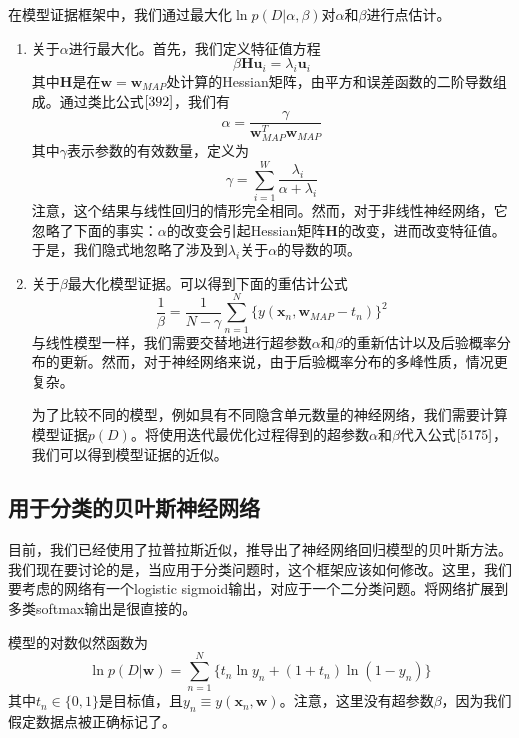 在模型证据框架中，我们通过最大化$\ln p(D|\alpha,\beta)$对$\alpha$和$\beta$进行点估计。
\begin{enumerate}
	\item 关于$\alpha$进行最大化。首先，我们定义特征值方程
	\begin{equation}
		\beta \boldsymbol{Hu}_{i}=\lambda_i\boldsymbol{u}_i
	\end{equation}
	其中$\boldsymbol{H}$是在$\boldsymbol{w}=\boldsymbol{w}_{MAP}$处计算的Hessian矩阵，由平方和误差函数的二阶导数组成。通过类比公式$\ref{392}$，我们有
	\begin{equation}
		\alpha=\frac{\gamma}{\boldsymbol{w}_{MAP}^T\boldsymbol{w}_{MAP} }
	\end{equation}
	其中$\gamma$表示参数的有效数量，定义为
	\begin{equation}
	\label{5178}
		\gamma =\sum_{i=1}^{W}\frac{\lambda_i}{\alpha+\lambda_i}
	\end{equation}
	注意，这个结果与线性回归的情形完全相同。然而，对于非线性神经网络，它忽略了下面的事实：$\alpha$的改变会引起Hessian矩阵$\boldsymbol{H}$的改变，进而改变特征值。于是，我们隐式地忽略了涉及到$\lambda_i$关于$\alpha$的导数的项。
	
	\item 关于$\beta$最大化模型证据。可以得到下面的重估计公式 
	\begin{equation}
		\frac{1}{\beta}=\frac{1}{N-\gamma}\sum_{n=1}^{N}\{y(\boldsymbol{x}_n,\boldsymbol{w}_{MAP}-t_n) \}^2
	\end{equation}
	与线性模型一样，我们需要交替地进行超参数$\alpha$和$\beta$的重新估计以及后验概率分布的更新。然而，对于神经网络来说，由于后验概率分布的多峰性质，情况更复杂。
	
	为了比较不同的模型，例如具有不同隐含单元数量的神经网络，我们需要计算模型证据$p(D)$。将使用迭代最优化过程得到的超参数$\alpha$和$\beta$代入公式$\ref{5175}$，我们可以得到模型证据的近似。
\end{enumerate}
\subsection*{用于分类的贝叶斯神经网络}
目前，我们已经使用了拉普拉斯近似，推导出了神经网络回归模型的贝叶斯方法。我们现在要讨论的是，当应用于分类问题时，这个框架应该如何修改。这里，我们要考虑的网络有一个logistic sigmoid输出，对应于一个二分类问题。将网络扩展到多类softmax输出是很直接的。

模型的对数似然函数为
\begin{equation}
	\ln p(D|\boldsymbol{w})=\sum_{n=1}^{N}\{t_n\ln y_n +(1+t_n)\ln (1-y_n) \}
\end{equation}
其中$t_n\in \{0,1 \}$是目标值，且$y_n\equiv y(\boldsymbol{x}_n,\boldsymbol{w})$。注意，这里没有超参数$\beta$，因为我们假定数据点被正确标记了。

